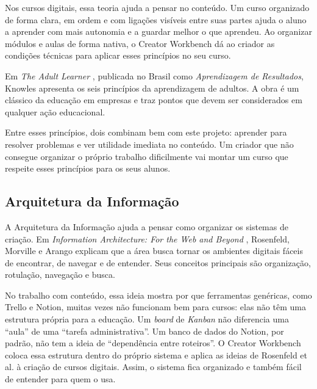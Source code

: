 Nos cursos digitais, essa teoria ajuda a pensar no conteúdo. Um curso organizado de forma clara, em ordem e com ligações visíveis entre suas partes ajuda o aluno a aprender com mais autonomia e a guardar melhor o que aprendeu. Ao organizar módulos e aulas de forma nativa, o Creator Workbench dá ao criador as condições técnicas para aplicar esses princípios no seu curso.

Em \textit{The Adult Learner} \cite{knowlesadult}, publicada no Brasil como \textit{Aprendizagem de Resultados}, Knowles apresenta os seis princípios da aprendizagem de adultos. A obra é um clássico da educação em empresas e traz pontos que devem ser considerados em qualquer ação educacional.

Entre esses princípios, dois combinam bem com este projeto: aprender para resolver problemas e ver utilidade imediata no conteúdo. Um criador que não consegue organizar o próprio trabalho dificilmente vai montar um curso que respeite esses princípios para os seus alunos.

\subsection{Arquitetura da Informação}

A Arquitetura da Informação ajuda a pensar como organizar os sistemas de criação. Em \textit{Information Architecture: For the Web and Beyond} \cite{rosenfeld2015}, Rosenfeld, Morville e Arango explicam que a área busca tornar os ambientes digitais fáceis de encontrar, de navegar e de entender. Seus conceitos principais são organização, rotulação, navegação e busca.

No trabalho com conteúdo, essa ideia mostra por que ferramentas genéricas, como Trello e Notion, muitas vezes não funcionam bem para cursos: elas não têm uma estrutura própria para a educação. Um \textit{board} de \textit{Kanban} não diferencia uma ``aula'' de uma ``tarefa administrativa''. Um banco de dados do Notion, por padrão, não tem a ideia de ``dependência entre roteiros''. O Creator Workbench coloca essa estrutura dentro do próprio sistema e aplica as ideias de Rosenfeld et al. à criação de cursos digitais. Assim, o sistema fica organizado e também fácil de entender para quem o usa.